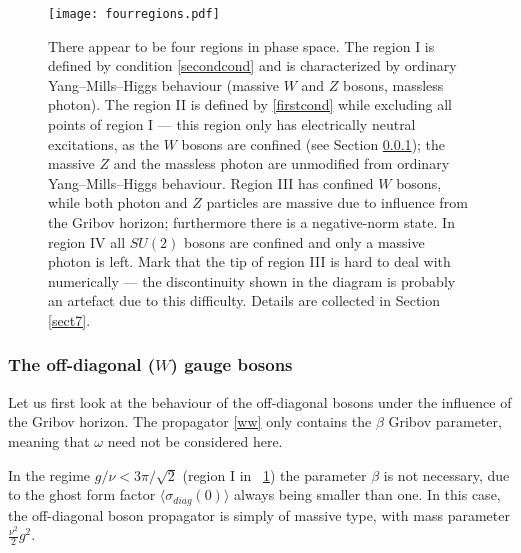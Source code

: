 \begin{figure}\begin{center}
\texttt{[image: fourregions.pdf]}
\caption{There appear to be four regions in phase space. The region I is defined by condition \eqref{secondcond} and is characterized by ordinary Yang--Mills--Higgs behaviour (massive $W$ and $Z$ bosons, massless photon). The region II is defined by \eqref{firstcond} while excluding all points of region I --- this region only has electrically neutral excitations, as the $W$ bosons are confined (see Section \ref{sect6}); the massive $Z$ and the massless photon are unmodified from ordinary Yang--Mills--Higgs behaviour. Region III has confined $W$ bosons, while both photon and $Z$ particles are massive due to influence from the Gribov horizon; furthermore there is a negative-norm state. In region IV all $SU(2)$ bosons are confined and only a massive photon is left. Mark that the tip of region III is hard to deal with numerically --- the discontinuity shown in the diagram is probably an artefact due to this difficulty.  Details are collected in Section \ref{sect7}. \label{regionsdiag1}}
\end{center}\end{figure}

















\subsubsection{The off-diagonal ($W$) gauge bosons} 
\label{sect6}
Let us first look at the behaviour of the off-diagonal bosons under the influence of the Gribov horizon. The propagator \eqref{ww}  only contains the $\beta$ Gribov parameter, meaning that $\omega$ need not be considered here.

In the regime $g/\nu<3\pi/\sqrt2$ (region I in \figurename\ \ref{regionsdiag1}) the parameter $\beta$ is not necessary, due to the ghost form factor $\langle\sigma_{diag}(0)\rangle$ always being smaller than one. In this case, the off-diagonal boson propagator is simply of massive type, with mass parameter $\frac{\nu^{2}}{2}g^{2}$.

